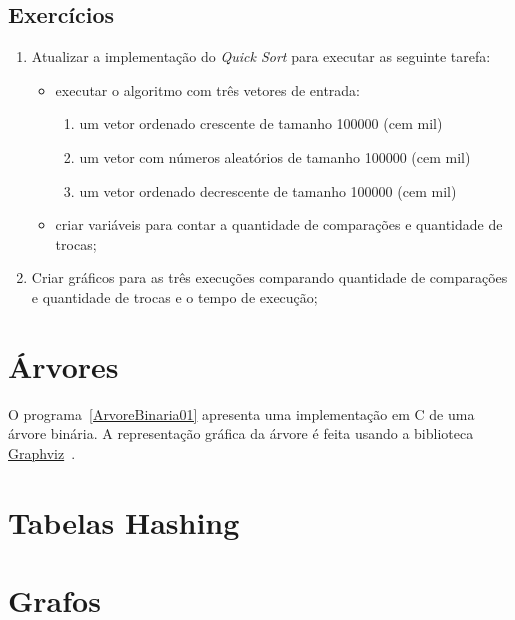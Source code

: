 \documentclass[11pt,fleqn]{book} %
\begin{document}
\subsection*{Exercícios}
\begin{enumerate}
	\item Atualizar a implementação do \textit{Quick Sort} para executar as seguinte tarefa:
	\begin{itemize}
		\item executar o algoritmo com três vetores de entrada:
		\begin{enumerate}
			\item um vetor ordenado crescente de tamanho 100000 (cem mil)
			\item um vetor com números aleatórios de tamanho 100000 (cem mil)
			\item um vetor ordenado decrescente de tamanho 100000 (cem mil)
		\end{enumerate} 
		\item criar variáveis para contar a quantidade de comparações e quantidade de trocas;
	\end{itemize} 
	\item Criar gráficos para as três execuções comparando quantidade de comparações e quantidade de trocas e o tempo de execução;
\end{enumerate} 




\newpage
\section{Árvores}\label{arvores}

O  programa~\ref{ArvoreBinaria01} apresenta uma implementação em C de uma árvore binária.
A representação gráfica da árvore é feita usando a biblioteca \href{http://graphviz.org/}{Graphviz}~\cite{Ellson03graphvizand}.

\label{ArvoreBinaria01}


\section{Tabelas Hashing}\label{hashing}

\section{Grafos}\label{grafos}
\end{document}
